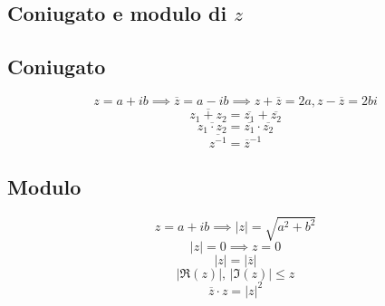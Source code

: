 \documentclass{report}
\begin{document}
    \subsection{Coniugato e modulo di $z$}
        \subsection{Coniugato}
            $$z = a + ib \implies \overline{z} = a - ib \implies z + \overline{z} = 2a, z - \overline{z} = 2bi$$
            $$\overline{z_1 + z_2} = \overline{z_1} + \overline{z_2}$$
            $$\overline{z_1 \cdot z_2} = \overline{z_1} \cdot \overline{z_2}$$
            $$\overline{z^{-1}} = \overline{z}^{-1}$$
        \subsection{Modulo}
            $$z = a + ib \implies |z| = \sqrt{a^2 + b^2}$$
            $$|z| = 0 \implies z = 0$$
            $$|z| = |\overline{z}|$$
            $$|\Re\left(z\right)|, \, |\Im\left(z\right)| \leq z$$
            $$\overline{z} \cdot z = |z|^2$$
\end{document}
